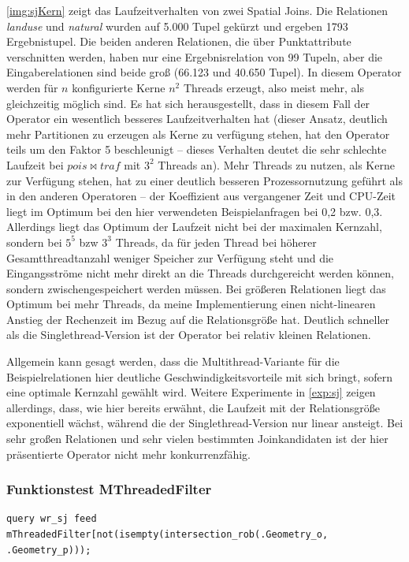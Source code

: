 \documentclass[a4paper,12pt,twoside]{article}
\newcommand{\Fb}[1]{\textit{#1}} %
\begin{document}
{\autoref{img:sjKern} zeigt das Laufzeitverhalten von zwei Spatial Joins. Die Relationen \Fb{landuse} und \Fb{natural} wurden auf 5.000 Tupel gekürzt und ergeben 1793 Ergebnistupel. Die beiden anderen Relationen, die über Punktattribute verschnitten werden, haben nur eine Ergebnisrelation von 99 Tupeln, aber die Eingaberelationen sind beide groß (66.123 und 40.650 Tupel). In diesem Operator werden für $n$ konfigurierte Kerne $n^2$ Threads erzeugt, also meist mehr, als gleichzeitig möglich sind. Es hat sich herausgestellt, dass in diesem Fall der Operator ein wesentlich besseres Laufzeitverhalten hat (dieser Ansatz, deutlich mehr Partitionen zu erzeugen als Kerne zu verfügung stehen, hat den Operator teils um den Faktor 5 beschleunigt -- dieses Verhalten deutet die sehr schlechte Laufzeit bei $pois \bowtie traf$ mit $3^2$ Threads an). Mehr Threads zu nutzen, als Kerne zur Verfügung stehen, hat zu einer deutlich besseren Prozessornutzung geführt als in den anderen Operatoren -- der Koeffizient aus vergangener Zeit und CPU-Zeit liegt im Optimum bei den hier verwendeten Beispielanfragen bei 0,2 bzw. 0,3. Allerdings liegt das Optimum der Laufzeit nicht bei der maximalen Kernzahl, sondern bei $5^5$ bzw $3^3$ Threads, da für jeden Thread bei höherer Gesamtthreadtanzahl weniger Speicher zur Verfügung steht und die Eingangsströme nicht mehr direkt an die Threads durchgereicht werden können, sondern zwischengespeichert werden müssen. Bei größeren Relationen liegt das Optimum bei mehr Threads, da meine Implementierung einen nicht-linearen Anstieg der Rechenzeit im Bezug auf die Relationsgröße hat. Deutlich schneller als die Singlethread-Version ist der Operator bei relativ kleinen Relationen.

Allgemein kann gesagt werden, dass die Multithread-Variante für die Beispielrelationen hier deutliche Geschwindigkeitsvorteile mit sich bringt, sofern eine optimale Kernzahl gewählt wird. Weitere Experimente in \autoref{exp:sj} zeigen allerdings, dass, wie hier bereits erwähnt, die Laufzeit mit der Relationsgröße exponentiell wächst, während die der Singlethread-Version nur linear ansteigt. Bei sehr großen Relationen und sehr vielen bestimmten Joinkandidaten ist der hier präsentierte Operator nicht mehr konkurrenzfähig.    


\subsubsection{Funktionstest MThreadedFilter}
\label{funk:filter}

\begin{minipage}{\linewidth}
	\begin{lstlisting}[caption={Testquery für den Filter-Operator, die auf Schnittpunkte zwischen Straßen und Wasserwegen prüft.}, label=list:testfilter]
	query wr_sj feed mThreadedFilter[not(isempty(intersection_rob(.Geometry_o, .Geometry_p)));
	\end{lstlisting}
\end{minipage}

}
\end{document}

